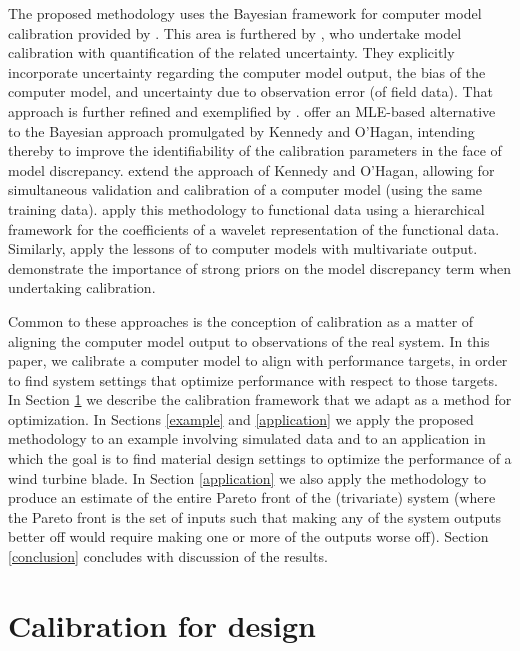 \documentclass[12pt]{article}
\begin{document}
The proposed methodology uses the Bayesian framework for computer model calibration provided by  \cite{Kennedy2001}.
% 
This area is furthered by \cite{Higdon2004}, who undertake model calibration with quantification of the related uncertainty. 
They explicitly incorporate uncertainty regarding the computer model output, the bias of the computer model, and uncertainty due to observation error (of field data). 
%
That approach is further refined and exemplified by \cite{Williams2006}.
%
\cite{Loeppky2006} offer an MLE-based alternative to the Bayesian approach promulgated by Kennedy and O'Hagan, intending thereby to improve the identifiability of the calibration parameters in the face of model discrepancy. 
%
\cite{Bayarri2007} extend the approach of Kennedy and O'Hagan, allowing for simultaneous validation and calibration of a computer model (using the same training data). 
%
\cite{Bayarri} apply this methodology to functional data using a hierarchical framework for the coefficients of a wavelet representation of the functional data. 
%
Similarly, \cite{Paulo2012} apply the lessons of \cite{Bayarri2007} to computer models with multivariate output.
%
\cite{Brynjarsdottir2014} demonstrate the importance of strong priors on the model discrepancy term when undertaking calibration.

Common to these approaches is the conception of calibration as a matter of aligning the computer model output to observations of the real system. 
%
In this paper, we calibrate a computer model to align with performance targets, in order to find system settings that optimize performance with respect to those targets.
%
In Section \ref{calib_for_design} we describe the calibration framework that we adapt as a method for optimization. 
%
In Sections \ref{example} and \ref{application} we apply the proposed methodology to an example involving simulated data and to an application in which the goal is to find material design settings to optimize the performance of a wind turbine blade.
%
In Section \ref{application} we also apply the methodology to produce an estimate of the entire Pareto front of the (trivariate) system (where the Pareto front is the set of inputs such that making any of the system outputs better off would require making one or more of the outputs worse off).
%
Section \ref{conclusion} concludes with discussion of the results.

\section{Calibration for design}\label{calib_for_design}
\end{document}

